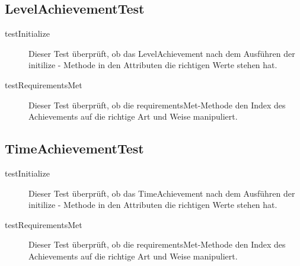 \subsection{LevelAchievementTest}

\begin{description}
\item[testInitialize]
Dieser Test überprüft, ob das LevelAchievement nach dem Ausführen der initilize - Methode in den Attributen die richtigen Werte stehen hat.

\item[testRequirementsMet]
Dieser Test überprüft, ob die requirementsMet-Methode den Index des Achievements auf die richtige Art und Weise manipuliert.

\end{description}


\subsection{TimeAchievementTest}

\begin{description}
\item[testInitialize]
Dieser Test überprüft, ob das TimeAchievement nach dem Ausführen der initilize - Methode in den Attributen die richtigen Werte stehen hat.

\item[testRequirementsMet]
Dieser Test überprüft, ob die requirementsMet-Methode den Index des Achievements auf die richtige Art und Weise manipuliert.

\end{description}


